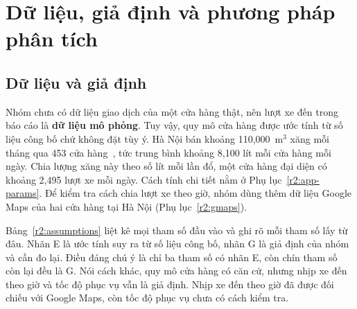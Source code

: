 
\section{Dữ liệu, giả định và phương pháp phân tích}
\label{r2:method}
\subsection{Dữ liệu và giả định}
\noindent
Nhóm chưa có dữ liệu giao dịch của một cửa hàng thật, nên lượt xe đến trong báo cáo là \textbf{dữ liệu mô phỏng}. Tuy vậy, quy mô cửa hàng được ước tính từ số liệu công bố chứ không đặt tùy ý. Hà Nội bán khoảng 110,000~m$^3$ xăng mỗi tháng qua 453 cửa hàng~\cite{sct2026}, tức trung bình khoảng 8,100 lít mỗi cửa hàng mỗi ngày. Chia lượng xăng này theo số lít mỗi lần đổ, một cửa hàng đại diện có khoảng 2,495 lượt xe mỗi ngày.
Cách tính chi tiết nằm ở Phụ lục~\ref{r2:app-params}. Để kiểm tra cách chia lượt xe theo giờ, nhóm dùng thêm dữ liệu Google Maps của hai cửa hàng tại Hà Nội (Phụ lục~\ref{r2:gmaps}).

Bảng~\ref{r2:assumptions} liệt kê mọi tham số đầu vào và ghi rõ mỗi tham số lấy từ đâu. Nhãn E là ước tính suy ra từ số liệu công bố, nhãn G là giả định của nhóm và cần đo lại. Điều đáng chú ý là chỉ ba tham số có nhãn E, còn chín tham số còn lại đều là G. Nói cách khác, quy mô cửa hàng có căn cứ, nhưng nhịp xe đến theo giờ và tốc độ phục vụ vẫn là giả định. Nhịp xe đến theo giờ đã được đối chiếu với Google Maps, còn tốc độ phục vụ chưa có cách kiểm tra.

